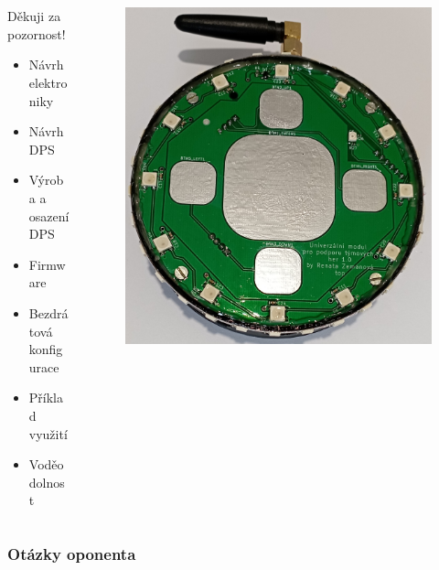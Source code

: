 \documentclass[%
  12pt,       				%
	t,                  %
	aspectratio=1610,   %
	unicode,						%
]{beamer}				    	%
\begin{document}
\begin{frame}[c] 
	\frametitle{\mbox{ }}
	\begin{center}
		\begin{columns}[T] 								%
			\begin{column}{0.3\textwidth}		%
				{\Huge Děkuji za pozornost!}
				\vspace{0.5cm}
				\begin{itemize}
					\item Návrh elektroniky
					\item Návrh DPS
					\item Výroba a osazení DPS
					\item Firmware 
					\item Bezdrátová konfigurace
					\item Příklad využití 
					\item Voděodolnost
				\end{itemize}
			\end{column}
			\begin{column}{0.7\textwidth}		%
				\begin{figure}
					\centering
					\includegraphics[width=0.65\columnwidth]{obrazky/v_krabicce.jpg}
				\end{figure}
			\end{column}
		\end{columns}	
	\end{center}
\end{frame}

\begin{frame} 
	\frametitle{Otázky oponenta}
	
\end{frame}
\end{document}
